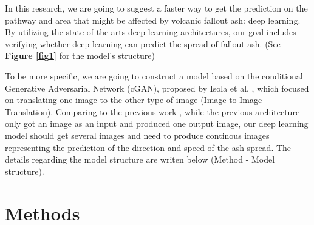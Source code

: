 \documentclass{article}
\begin{document}
\begin{doublespacing}
{  In this research, we are going to suggest a faster way to get the prediction on the pathway and 
  area that might be affected by volcanic fallout ash: deep learning. By utilizing the
  state-of-the-arts deep learning architectures, our goal includes verifying whether deep learning 
  can predict the spread of fallout ash. (See \textbf{Figure \ref{fig1}} for the model's structure)

  \fontsize{10pt}{10.5pt} 

  To be more specific, we are going to construct a model based on the conditional Generative 
  Adversarial Network (cGAN), proposed by Isola et al. \cite{isola2016imagetoimage}, which focused 
  on translating one image to the other type of image (Image-to-Image Translation). Comparing to the 
  previous work \cite{isola2016imagetoimage}, while the previous architecture only got an image as 
  an input and produced one output image, our deep learning model should get several images and need
  to produce continous images representing the prediction of the direction and speed of the ash 
  spread. The details regarding the model structure are writen below (Method - Model structure).
}

\section{Methods}  %
\fontsize{11pt}{11pt} \selectfont {
}
\end{doublespacing}
\end{document}
